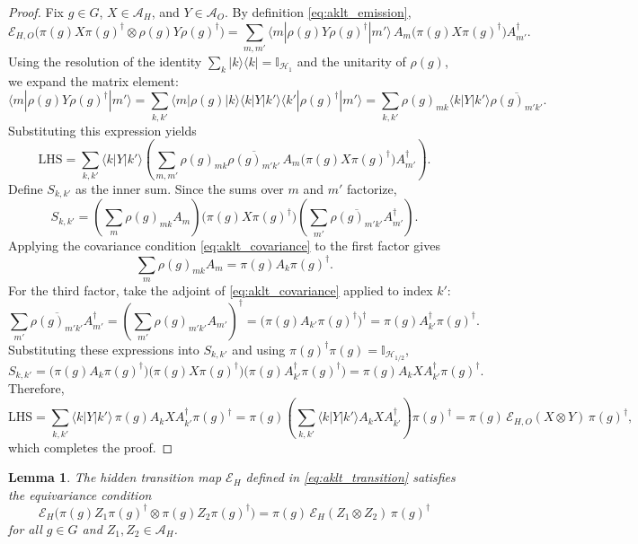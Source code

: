 \documentclass[12pt,a4paper]{article}
\newtheorem{lemma}[theorem]{Lemma}
\begin{document}
\begin{proof}
Fix $g \in G$, $X \in \mathcal{A}_H$, and $Y \in \mathcal{A}_O$. By definition \eqref{eq:aklt_emission},
\[
\mathcal{E}_{H,O}\bigl( \pi(g) X \pi(g)^\dagger \otimes \rho(g) Y \rho(g)^\dagger \bigr) = \sum_{m,m'} \langle m | \rho(g) Y \rho(g)^\dagger | m' \rangle \, A_m \bigl( \pi(g) X \pi(g)^\dagger \bigr) A_{m'}^\dagger.
\]
Using the resolution of the identity $\sum_{k} |k\rangle\langle k| = \mathbb{I}_{\mathcal{H}_1}$ and the unitarity of $\rho(g)$, we expand the matrix element:
\[
\langle m | \rho(g) Y \rho(g)^\dagger | m' \rangle = \sum_{k,k'} \langle m | \rho(g) | k \rangle \langle k | Y | k' \rangle \langle k' | \rho(g)^\dagger | m' \rangle = \sum_{k,k'} \rho(g)_{mk} \langle k | Y | k' \rangle \overline{\rho(g)_{m'k'}}.
\]
Substituting this expression yields
\[
\mathrm{LHS} = \sum_{k,k'} \langle k | Y | k' \rangle \left( \sum_{m,m'} \rho(g)_{mk} \overline{\rho(g)_{m'k'}} \, A_m \bigl( \pi(g) X \pi(g)^\dagger \bigr) A_{m'}^\dagger \right).
\]
Define $S_{k,k'}$ as the inner sum. Since the sums over $m$ and $m'$ factorize,
\[
S_{k,k'} = \left( \sum_{m} \rho(g)_{mk} A_m \right) \bigl( \pi(g) X \pi(g)^\dagger \bigr) \left( \sum_{m'} \overline{\rho(g)_{m'k'}} A_{m'}^\dagger \right).
\]
Applying the covariance condition \eqref{eq:aklt_covariance} to the first factor gives
\[
\sum_{m} \rho(g)_{mk} A_m = \pi(g) A_k \pi(g)^\dagger.
\]
For the third factor, take the adjoint of \eqref{eq:aklt_covariance} applied to index $k'$:
\[
\sum_{m'} \overline{\rho(g)_{m'k'}} A_{m'}^\dagger = \left( \sum_{m'} \rho(g)_{m'k'} A_{m'} \right)^\dagger = \bigl( \pi(g) A_{k'} \pi(g)^\dagger \bigr)^\dagger = \pi(g) A_{k'}^\dagger \pi(g)^\dagger.
\]
Substituting these expressions into $S_{k,k'}$ and using $\pi(g)^\dagger \pi(g) = \mathbb{I}_{\mathcal{H}_{1/2}}$,
\[
S_{k,k'} = \bigl( \pi(g) A_k \pi(g)^\dagger \bigr) \bigl( \pi(g) X \pi(g)^\dagger \bigr) \bigl( \pi(g) A_{k'}^\dagger \pi(g)^\dagger \bigr) = \pi(g) A_k X A_{k'}^\dagger \pi(g)^\dagger.
\]
Therefore,
\[
\mathrm{LHS} = \sum_{k,k'} \langle k | Y | k' \rangle \, \pi(g) A_k X A_{k'}^\dagger \pi(g)^\dagger = \pi(g) \left( \sum_{k,k'} \langle k | Y | k' \rangle A_k X A_{k'}^\dagger \right) \pi(g)^\dagger = \pi(g) \, \mathcal{E}_{H,O}(X \otimes Y) \, \pi(g)^\dagger,
\]
which completes the proof.
\end{proof}

\begin{lemma}\label{lem:aklt_transition_equivariance}
The hidden transition map $\mathcal{E}_H$ defined in \eqref{eq:aklt_transition} satisfies the equivariance condition
\begin{equation}
\mathcal{E}_H\bigl( \pi(g) Z_1 \pi(g)^\dagger \otimes \pi(g) Z_2 \pi(g)^\dagger \bigr) = \pi(g) \, \mathcal{E}_H(Z_1 \otimes Z_2) \, \pi(g)^\dagger
\label{eq:aklt_transition_equivariance}
\end{equation}
for all $g \in G$ and $Z_1, Z_2 \in \mathcal{A}_H$.
\end{lemma}
\end{document}
